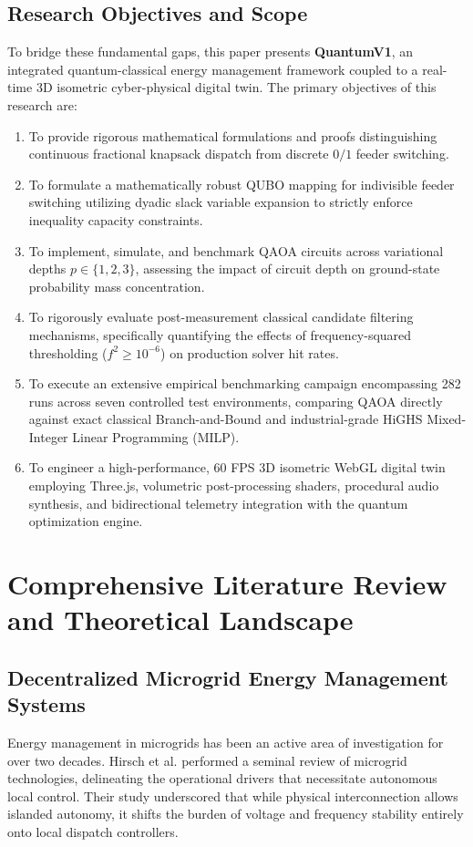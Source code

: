 \documentclass[11pt,a4paper]{article}
\theoremstyle{definition}
\theoremstyle{remark}
\begin{document}
\subsection{Research Objectives and Scope}
To bridge these fundamental gaps, this paper presents \textbf{QuantumV1}, an integrated quantum-classical energy management framework coupled to a real-time 3D isometric cyber-physical digital twin. The primary objectives of this research are:
\begin{enumerate}
    \item To provide rigorous mathematical formulations and proofs distinguishing continuous fractional knapsack dispatch from discrete $0/1$ feeder switching.
    \item To formulate a mathematically robust QUBO mapping for indivisible feeder switching utilizing dyadic slack variable expansion to strictly enforce inequality capacity constraints.
    \item To implement, simulate, and benchmark QAOA circuits across variational depths $p \in \{1, 2, 3\}$, assessing the impact of circuit depth on ground-state probability mass concentration.
    \item To rigorously evaluate post-measurement classical candidate filtering mechanisms, specifically quantifying the effects of frequency-squared thresholding ($f^2 \ge 10^{-6}$) on production solver hit rates.
    \item To execute an extensive empirical benchmarking campaign encompassing 282 runs across seven controlled test environments, comparing QAOA directly against exact classical Branch-and-Bound and industrial-grade HiGHS Mixed-Integer Linear Programming (MILP).
    \item To engineer a high-performance, 60 FPS 3D isometric WebGL digital twin employing Three.js, volumetric post-processing shaders, procedural audio synthesis, and bidirectional telemetry integration with the quantum optimization engine.
\end{enumerate}


\section{Comprehensive Literature Review and Theoretical Landscape}
\label{sec:lit_review}

\subsection{Decentralized Microgrid Energy Management Systems}
Energy management in microgrids has been an active area of investigation for over two decades. Hirsch et al. \cite{hirsch2018} performed a seminal review of microgrid technologies, delineating the operational drivers that necessitate autonomous local control. Their study underscored that while physical interconnection allows islanded autonomy, it shifts the burden of voltage and frequency stability entirely onto local dispatch controllers. 
\end{document}
